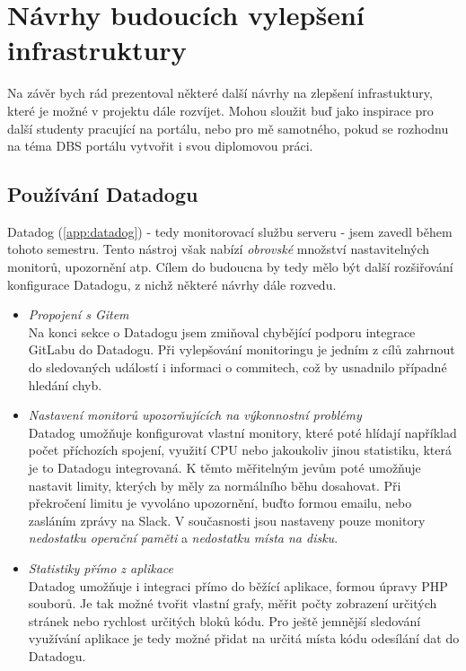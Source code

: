 \section{Návrhy budoucích vylepšení infrastruktury}

Na závěr bych rád prezentoval některé další návrhy na zlepšení infrastuktury, které je možné v projektu dále rozvíjet. Mohou sloužit buď jako inspirace pro další studenty pracující na portálu, nebo pro mě samotného, pokud se rozhodnu na téma DBS portálu vytvořit i svou diplomovou práci.

\subsection{Používání Datadogu}

Datadog (\ref{app:datadog}) - tedy monitorovací službu serveru - jsem zavedl během tohoto semestru. Tento nástroj však nabízí \emph{obrovské} množství nastavitelných monitorů, upozornění atp. Cílem do budoucna by tedy mělo být další rozšiřování konfigurace Datadogu, z nichž některé návrhy dále rozvedu.
\begin{itemize}
	\item \emph{Propojení s Gitem}\\Na konci sekce o Datadogu jsem zmiňoval chybějící podporu integrace GitLabu do Datadogu. Při vylepšování monitoringu je jedním z cílů zahrnout do sledovaných událostí i informaci o commitech, což by usnadnilo případné hledání chyb.
	\item \emph{Nastavení monitorů upozorňujících na výkonnostní problémy}\\Datadog umožňuje konfigurovat vlastní monitory, které poté hlídají například počet příchozích spojení, využití CPU nebo jakoukoliv jinou statistiku, která je to Datadogu integrovaná. K těmto měřitelným jevům poté umožňuje nastavit limity, kterých by měly za normálního běhu dosahovat. Při překročení limitu je vyvoláno upozornění, buďto formou emailu, nebo zasláním zprávy na Slack. V současnosti jsou nastaveny pouze monitory \emph{nedostatku operační paměti} a \emph{nedostatku místa na disku}.
	\item \emph{Statistiky přímo z aplikace}\\Datadog umožňuje i integraci přímo do běžící aplikace, formou úpravy PHP souborů. Je tak možné tvořit vlastní grafy, měřit počty zobrazení určitých stránek nebo rychlost určitých bloků kódu. Pro ještě jemnější sledování využívání aplikace je tedy možné přidat na určitá místa kódu odesílání dat do Datadogu.
\end{itemize}

